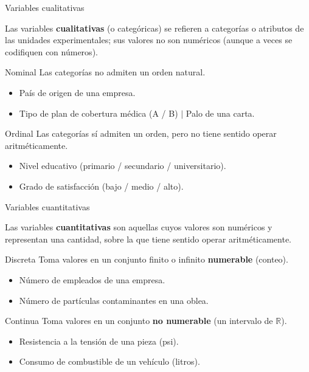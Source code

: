 \documentclass[aspectratio=169,11pt]{beamer}
\begin{document}
\begin{frame}{Variables cualitativas}
\begin{definition}
Las variables \textbf{cualitativas} (o categóricas) se refieren a categorías o atributos de las unidades experimentales; sus valores no son numéricos (aunque a veces se codifiquen con números).
\end{definition}

\begin{block}{Nominal}
Las categorías no admiten un orden natural.
\begin{itemize}
\item País de origen de una empresa.
\item Tipo de plan de cobertura médica (A / B) \quad $|$ \quad Palo de una carta.
\end{itemize}
\end{block}

\begin{block}{Ordinal}
Las categorías sí admiten un orden, pero no tiene sentido operar aritméticamente.
\begin{itemize}
\item Nivel educativo (primario / secundario / universitario).
\item Grado de satisfacción (bajo / medio / alto).
\end{itemize}
\end{block}
\end{frame}

\begin{frame}{Variables cuantitativas}
\begin{definition}
Las variables \textbf{cuantitativas} son aquellas cuyos valores son numéricos y representan una cantidad, sobre la que tiene sentido operar aritméticamente.
\end{definition}

\begin{block}{Discreta}
Toma valores en un conjunto finito o infinito \textbf{numerable} (conteo).
{\small
\begin{itemize}
\item Número de empleados de una empresa.
\item Número de partículas contaminantes en una oblea.
\end{itemize}
}
\end{block}

\begin{block}{Continua}
Toma valores en un conjunto \textbf{no numerable} (un intervalo de $\mathbb{R}$).
{\small
\begin{itemize}
\item Resistencia a la tensión de una pieza (psi).
\item Consumo de combustible de un vehículo (litros).
\end{itemize}
}
\end{block}
\end{frame}
\end{document}
